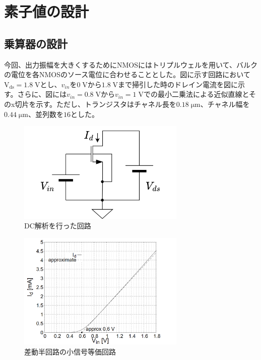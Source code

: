\documentclass[twocolumn]{jsarticle}
\begin{document}
\section{素子値の設計}
    \subsection{乗算器の設計}
        今回、出力振幅を大きくするためにNMOSにはトリプルウェルを用いて、バルクの電位を各NMOSのソース電位に合わせることとした。図に示す回路において$\mathrm{V_{ds}}=1.8\;\mathrm{V}$とし、$v_{in}$を$0\;\mathrm{V}$から$1.8\;\mathrm{V}$まで掃引した時のドレイン電流を図に示す。さらに、図には$v_{in}=0.8\;\mathrm{V}$から$v_{in}=1\;\mathrm{V}$での最小二乗法による近似直線とそのx切片を示す。ただし、トランジスタはチャネル長を$0.18\;\mathrm{\mu m}$、チャネル幅を$0.44\;\mathrm{\mu m}$、並列数を$16$とした。
        \begin{figure}[H]
        \begin{center}
            \includegraphics*[width = 80mm]{figures/nmos_unit_circuit.png}
            \caption{DC解析を行った回路}
            \label{fig:nmos_unit_circuit}
        \end{center}
        \end{figure}
        \begin{figure}[H]
            \begin{center}
                \includegraphics*[width = 80mm]{figures/nmos_unit.PNG}
                \caption{差動半回路の小信号等価回路}
                \label{fig:nmos_unit}
            \end{center}
        \end{figure}
\end{document}
